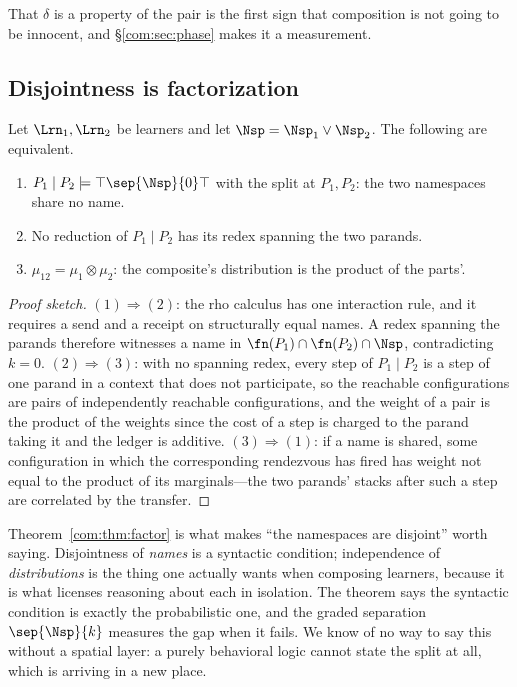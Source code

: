 That $\delta$ is a property of the pair is the first sign that composition is not going to be
innocent, and \S\ref{com:sec:phase} makes it a measurement.

\subsection{Disjointness is factorization}\label{com:S4.2}

\begin{theorem}[Factorization]\label{com:thm:factor}
Let $\Lrn_1, \Lrn_2$ be learners and let $\Nsp = \Nsp_1 \vee \Nsp_2$. The following are
equivalent.
\begin{enumerate}[label=(\arabic*)]
\item $P_1 \mid P_2 \models \top \sep{\Nsp}{0} \top$ with the split at $P_1, P_2$: the two
namespaces share no name.
\item No reduction of $P_1 \mid P_2$ has its redex spanning the two parands.
\item $\mu_{12} = \mu_1 \otimes \mu_2$: the composite's distribution is the product of the
parts'.
\end{enumerate}
\end{theorem}

\begin{proof}[Proof sketch]
$(1)\Rightarrow(2)$: the rho calculus has one interaction rule, and it requires a send and a
receipt on structurally equal names. A redex spanning the parands therefore witnesses a name in
$\fn(P_1) \cap \fn(P_2) \cap \Nsp$, contradicting $k=0$. $(2)\Rightarrow(3)$: with no spanning
redex, every step of $P_1\mid P_2$ is a step of one parand in a context that does not participate,
so the reachable configurations are pairs of independently reachable configurations, and the
weight of a pair is the product of the weights since the cost of a step is charged to the parand
taking it and the ledger is additive. $(3)\Rightarrow(1)$: if a name is shared, some
configuration in which the corresponding rendezvous has fired has weight not equal to the product
of its marginals---the two parands' stacks after such a step are correlated by the transfer.
\end{proof}

\begin{remark}\label{com:why-this-right-statement}
Theorem~\ref{com:thm:factor} is what makes ``the namespaces are disjoint'' worth saying. Disjointness
of \emph{names} is a syntactic condition; independence of \emph{distributions} is the thing one
actually wants when composing learners, because it is what licenses reasoning about each in
isolation. The theorem says the syntactic condition is exactly the probabilistic one, and the
graded separation $\sep{\Nsp}{k}$ measures the gap when it fails. We know of no way to say this
without a spatial layer: a purely behavioral logic cannot state the split at all, which is
\cite[Rem.~5]{ClassifierNote} arriving in a new place.
\end{remark}

